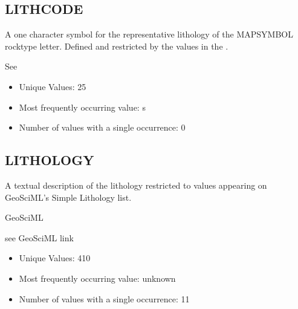 \documentclass[letterpaper,10pt,english]{sphinxmanual}
\begin{document}
\subsection{LITHCODE}
\label{\detokenize{field_glossary:lithcode}}
A one character symbol for the representative lithology of the MAPSYMBOL rock\sphinxhyphen{}type letter. Defined and restricted by the values in the {\hyperref[\detokenize{legend::doc}]{}}.


See {\hyperref[\detokenize{legend::doc}]{}}

\begin{itemize}
\item {} 
Unique Values: 25

\item {} 
Most frequently occurring value: s

\item {} 
Number of values with a single occurrence: 0

\end{itemize}


\subsection{LITHOLOGY}
\label{\detokenize{field_glossary:lithology}}
A textual description of the lithology restricted to values appearing on GeoSciML’s Simple Lithology list.

GeoSciML

see GeoSciML link




\begin{itemize}
\item {} 
Unique Values: 410

\item {} 
Most frequently occurring value: unknown

\item {} 
Number of values with a single occurrence: 11

\end{itemize}
\end{document}
